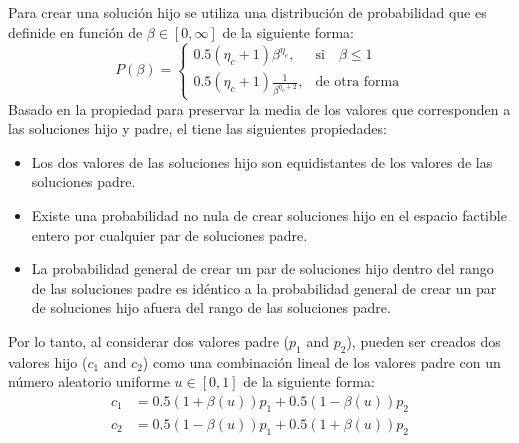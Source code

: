 %
Para crear una solución hijo se utiliza una distribución de probabilidad que es definide en función de $\beta \in [0, \infty]$ de la siguiente forma:
%
\begin{equation}
    P(\beta)= 
\begin{cases}
     0.5(\eta_c + 1)\beta^{\eta_c},& \text{si} \quad \beta \leq 1\\
     0.5(\eta_c + 1) \frac{1}{\beta^{\eta_c + 2}} ,& \text{de otra forma}
\end{cases}
\end{equation}
%
Basado en la propiedad para preservar la media de los valores que corresponden a las soluciones hijo y padre, el \SBX{} tiene las siguientes propiedades:
\begin{itemize}
\item Los dos valores de las soluciones hijo son equidistantes de los valores de las soluciones padre.
\item Existe una probabilidad no nula de crear soluciones hijo en el espacio factible entero por cualquier par de soluciones padre.
\item La probabilidad general de crear un par de soluciones hijo dentro del rango de las soluciones padre es idéntico a la probabilidad general de crear un par de soluciones hijo afuera del rango de las soluciones padre.
\end{itemize}

Por lo tanto, al considerar dos valores padre ($p_1$ and $p_2$), pueden ser creados dos valores hijo ($c_1$ and $c_2$)  como una combinación lineal de los valores padre con un número aleatorio uniforme $u \in [0, 1]$ de la siguiente forma:
\begin{equation} 
\begin{split}
c_1 &= 0.5(1 + \beta(u))p_1 + 0.5(1 - \beta(u)) p_2 \\
c_2 &= 0.5(1 - \beta(u))p_1 + 0.5(1 + \beta(u)) p_2
\end{split}
\end{equation}

